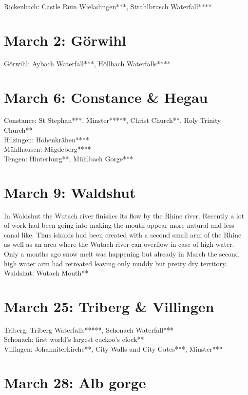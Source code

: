 Rickenbach: Castle Ruin Wieladingen***, Strahlbrusch Waterfall****

\section{March 2: G\"orwihl}
\label{2021:Goerwihl}

G\"orwihl: Aybach Waterfall***, H\"ollbach Waterfalls****

\section{March 6: Constance \& Hegau}
\label{2021:Konstanz}

Constance: St Stephan***, Minster*****, Christ Church**, Holy Trinity Church**\\
Hilzingen: Hohenkr\"ahen****\\
M\"uhlhausen: M\"agdeberg****\\
Tengen: Hinterburg**, M\"uhlbach Gorge***

\section{March 9: Waldshut}
\label{2021:Waldshut0309}

In Waldshut the Wutach river finishes its flow by the Rhine river. Recently a lot of work had been going into making the mouth appear more natural and less canal like. Thus islands had been created with a second small arm of the Rhine as well as an area where the Wutach river can overflow in case of high water. Only a months ago snow melt was happening but already in March the second high water arm had retreated leaving only muddy but pretty dry territory.\\

Waldshut: Wutach Mouth**\\

\section{March 25: Triberg \& Villingen}
\label{2021:Triberg}

Triberg: Triberg Waterfalls*****, Schonach Waterfall***\\
Schonach: first world's largest cuckoo's clock**\\
Villingen: Johanniterkirche**, City Walls and City Gates***, Minster***

\section{March 28: Alb gorge}
\label{2021:Albtal}

